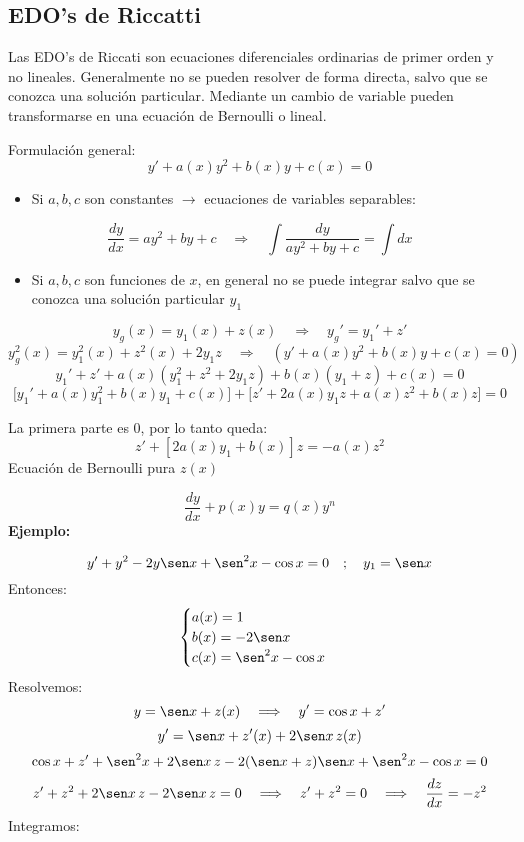 \documentclass[a4paper,12pt]{article}
\begin{document}
\subsection{EDO's de Riccatti}
\noindent
Las EDO’s de Riccati son ecuaciones diferenciales ordinarias de primer orden y no lineales.
Generalmente no se pueden resolver de forma directa, salvo que se conozca una solución particular.
Mediante un cambio de variable pueden transformarse en una ecuación de Bernoulli o lineal.

\noindent
\medskip
Formulación general: 
\[
y' + a(x)y^2 + b(x)y + c(x) = 0
\]
\begin{itemize}
    \item Si $a, b, c$ son constantes $\longrightarrow$ ecuaciones de variables separables:
\end{itemize}

\[
\frac{dy}{dx} = ay^2 + by + c 
\quad \Longrightarrow \quad 
\int \frac{dy}{ay^2 + by + c} = \int dx
\]
\newpage
\noindent
\begin{itemize}
    \item Si $a, b, c$ son funciones de $x$, en general no se puede integrar salvo que se conozca una solución particular $y_1$
\end{itemize}
\[
y_g(x) = y_1(x) + z(x) \quad \Longrightarrow \quad y_g' = y_1' + z'
\]
\vspace{-0,2 em}
\[
y_g^2(x) = y_1^2(x) + z^2(x) + 2y_1z \quad \Rightarrow \quad (y' + a(x)y^2 + b(x)y + c(x) = 0)
\]
\vspace{-0,2 em}
\[
y_1' + z' + a(x)(y_1^2 + z^2 + 2y_1z) + b(x)(y_1 + z) + c(x) = 0
\]
\vspace{-0,2 em}
\[
\big[y_1' + a(x)y_1^2 + b(x)y_1 + c(x)\big] + \big[z' + 2a(x)y_1 z + a(x)z^2 + b(x)z\big] = 0
\]

\noindent
La primera parte es 0, por lo tanto queda:
\[
z' + [2a(x)y_1 + b(x)]z = -a(x)z^2
\]
Ecuación de Bernoulli pura $z(x)$

\[
\frac{dy}{dx} + p(x)y = q(x)y^n
\]
\textbf{Ejemplo:}

\[
y' + y^2 - 2y\sen x + \sen^2 x - \cos x = 0 
\quad ; \quad y_1 = \sen x
\]
Entonces:
\[
\begin{cases}
a(x) = 1 \\
b(x) = -2\sen x \\
c(x) = \sen^2 x - \cos x
\end{cases}
\]
Resolvemos:
\[
y = \sen x + z(x) \quad \Longrightarrow \quad y' = \cos x + z'
\]
\vspace{-0,5 em}
\[
y' = \sen x + z'(x) + 2\sen x \, z(x)
\]
\vspace{-0,5 em}
\[
\cos x + z' + \sen^2 x + 2\sen x \, z - 2(\sen x + z)\sen x + \sen^2 x - \cos x = 0
\]
\vspace{-0,5 em}
\[
z' + z^2 + 2\sen x \, z - 2\sen x \, z = 0 \quad \Longrightarrow \quad z' + z^2 = 0 \quad \Longrightarrow \quad \frac{dz}{dx} = -z^2
\]
\newpage
\noindent
Integramos:
\end{document}
